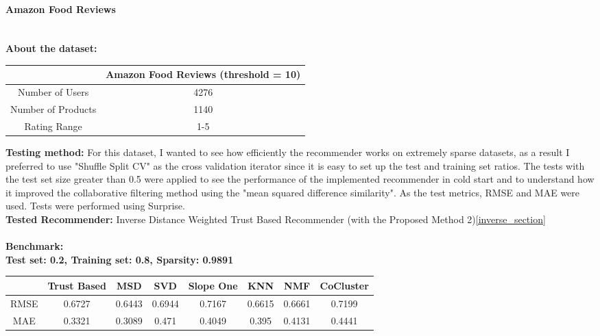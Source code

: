 	\paragraph{Amazon Food Reviews \cite{Amazonfoodreviews}} \mbox{}\\
	\textbf{About the dataset:} 
	\begin{center}
		\begin{tabular}{ | c | c |}
			\hline
			&Amazon Food Reviews (threshold = 10)  \\  
			\hline
			Number of Users & 4276 \\
			\hline
			Number of Products & 1140 \\
			\hline
			Rating Range & 1-5 \\
			\hline
		\end{tabular}
	\end{center} 
	\vspace{0.5cm}
	\textbf{Testing method:} For this dataset, I wanted to see how efficiently the recommender works on extremely sparse datasets, as a result I preferred to use "Shuffle Split CV" as the cross validation iterator since it is easy to set up the test and training set ratios. The tests with the test set size greater than 0.5 were applied to see the performance of the implemented recommender in cold start and to understand how it improved the collaborative filtering method using the "mean squared difference similarity". As the test metrics, RMSE and MAE were used. Tests were performed using Surprise.\\
	\textbf{Tested Recommender:} Inverse Distance Weighted Trust Based Recommender (with the Proposed Method 2)\ref{inverse_section} \\ \\
	\textbf{Benchmark:} \\
	\textbf{Test set: 0.2, Training set: 0.8, Sparsity: 0.9891}
	\begin{center}
		\begin{tabular}{ | c | c | c | c | c | c | c | c |}
			\hline
			& Trust Based & MSD & SVD & Slope One & KNN & NMF & CoCluster\\ 
			\hline
			RMSE&0.6727  & 0.6443  & 0.6944  & 0.7167  & 0.6615  & 0.6661  & 0.7199\\
			\hline
			MAE&0.3321  & 0.3089  & 0.471  & 0.4049  & 0.395  & 0.4131  & 0.4441\\
			\hline
		\end{tabular}
	\end{center} 
	\vspace{1cm}
